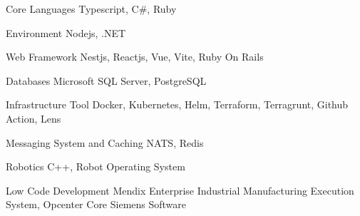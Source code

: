 

\begin{cvskills}
  \cvskill
    {Core Languages} %
    {Typescript, C\#, Ruby} %

  \cvskill
    {Environment} %
    {Nodejs, .NET} %

  \cvskill
    {Web Framework} %
    {Nestjs, Reactjs, Vue, Vite, Ruby On Rails} %

  \cvskill
    {Databases} %
    {Microsoft SQL Server, PostgreSQL} %

  \cvskill
    {Infrastructure Tool} %
    {Docker, Kubernetes, Helm, Terraform, Terragrunt, Github Action, Lens } %

  \cvskill
    {Messaging System and Caching} %
    {NATS, Redis} %

  \cvskill
    {Robotics} %
    {C++, Robot Operating System} %

  \cvskill
    {Low Code Development} %
    {Mendix} %
  \cvskill
    {Enterprise Industrial} %
    {Manufacturing Execution System, Opcenter Core Siemens Software} %

\end{cvskills}
